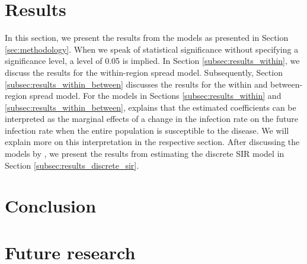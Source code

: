 \documentclass[12pt]{article}
\begin{document}
	\section{Results} \label{sec:results}
	In this section, we present the results from the models as presented in Section \ref{sec:methodology}. When we speak of statistical significance without specifying a significance level, a level of 0.05 is implied. In Section \ref{subsec:results_within}, we discuss the results for the within-region spread model. Subsequently, Section \ref{subsec:results_within_between} discusses the results for the within and between-region spread model. For the models in Sections \ref{subsec:results_within} and \ref{subsec:results_within_between}, \textcite{adda2016economic} explains that the estimated coefficients can be interpreted as the marginal effects of a change in the infection rate on the future infection rate when the entire population is susceptible to the disease. We will explain more on this interpretation in the respective section. After discussing the models by \textcite{adda2016economic}, we present the results from estimating the discrete SIR model in Section \ref{subsec:results_discrete_sir}.
	
	\newpage
	\section{Conclusion} \label{sec:conclusion}
	
	\newpage
	\section{Future research} \label{sec:future_research}
	

	
	
	\newpage
	\printbibliography
	
	\newpage\appendix
	
\end{document}
